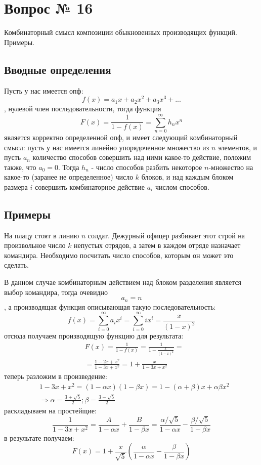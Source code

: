 \chapter{Вопрос № 16}

Комбинаторный смысл композиции обыкновенных производящих функций. Примеры.

\section{Вводные определения}

Пусть у нас имеется опф:
\[
	f\left(x\right) = a_1x + a_2x^2 + a_3x^3 + ...
\]
, нулевой член последовательности, тогда функция
\[
	F\left(x\right) = \frac{1}{1-f\left(x\right)} = \sum_{n=0}^\infty h_n x^n
\]
является корректно определенной опф, и имеет следующий комбинаторный смысл: пусть у нас имеется линейно упорядоченное множество из $n$ элементов, и пусть $a_n$ количество способов совершить над ними какое-то действие, положим также, что $a_0 = 0$. Тогда $h_n$ - число способов разбить некоторое $n$-множество на какое-то (заранее не определенное) число $k$ блоков, и над каждым блоком размера $i$ совершить комбинаторное действие $a_i$ числом способов.

\section{Примеры}

На плацу стоят в линию $n$ солдат. Дежурный офицер разбивает этот строй на произвольное число $k$ непустых отрядов, а затем в каждом отряде назначает командира. Необходимо посчитать число способов, которым он может это сделать.

В данном случае комбинаторным действием над блоком разделения является выбор командира, тогда очевидно $$ a_n = n $$, а производящая функция описывающая такую последовательность:
\[
	f\left(x\right) = \sum_{i=0}^\infty a_i x^i = \sum_{i=0}^\infty ix^i = \frac{x}{\left(1-x\right)^2}
\]
отсюда получаем производящую функцию для результата:
\[
	\begin{split}
		&F\left(x\right) = \frac{1}{1-f\left(x\right)} = \frac{1}{1 - \frac{x}{\left(1-x\right)^2}} = \\
		& = \frac{1-2x+x^2}{1-3x+x^2} = 1 + \frac{x}{1-3x+x^2}
	\end{split}
\]
теперь разложим в произведение:
\[
	\begin{split}
		&1-3x+x^2 = \left(1-\alpha x\right)\left(1-\beta x\right) = 1 - \left(\alpha+\beta\right)x + \alpha \beta x^2\\
		& \Rightarrow \alpha = \frac{3+\sqrt{5}}{2}; \beta = \frac{3-\sqrt{5}}{2}
	\end{split}
\]
раскладываем на простейщие:
\[
	\frac{1}{1-3x+x^2} = \frac{A}{1-\alpha x} + \frac{B}{1 - \beta x} = \frac{\alpha / \sqrt{5}}{1-\alpha x} - \frac{\beta / \sqrt{5}}{1 - \beta x}
\]
в результате получаем:
\[
	F\left(x\right) = 1 + \frac{x}{\sqrt{5}} \left(\frac{\alpha}{1-\alpha x} - \frac{\beta}{1-\beta x}\right)
\]

